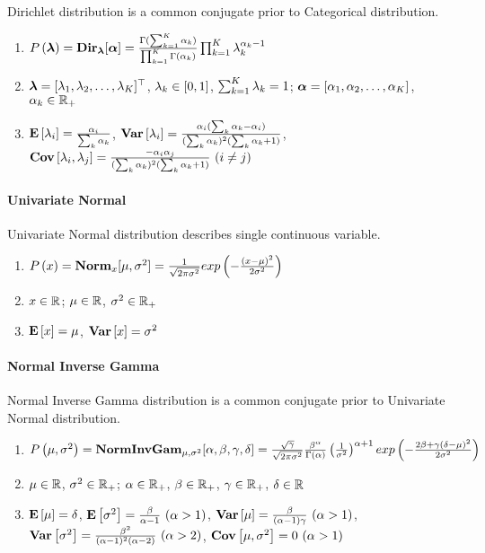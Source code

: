 Dirichlet distribution is a common conjugate prior to Categorical distribution.
\begin{enumerate}
	\item $P\left(\boldsymbol{\lambda}\right)=\mathbf{Dir}_{\boldsymbol{\lambda}}[\boldsymbol{\alpha}]=\frac{\Gamma(\sum_{k=1}^K\alpha_k)}{\prod_{k=1}^K\Gamma(\alpha_k)}\prod_{k=1}^K\lambda_k^{\alpha_k-1}$
	\item $\boldsymbol{\lambda}=[\lambda_1,\lambda_2,\dotsc,\lambda_K]{}^\top$, $\lambda_k \in [0,1]$, $\sum_{k=1}^K\lambda_k=1$; $\boldsymbol{\alpha}=[\alpha_1,\alpha_2,\dotsc,\alpha_K]$, $\alpha_k \in \mathbb{R}_+$
	\item $\mathbf{E}\left[\lambda_i\right]=\frac{\alpha_i}{\sum_k\alpha_k}$, $\mathbf{Var}\left[\lambda_i\right]=\frac{\alpha_i(\sum_k\alpha_k-\alpha_i)}{(\sum_k\alpha_k)^2(\sum_k\alpha_k+1)}$, $\C{\la_i,\la_j}=\frac{-\al_i\al_j}{(\sum_k\al_k)^2(\sum_k\al_k+1)}\ (i \neq j)$
\end{enumerate}

\paragraph{Univariate Normal}

Univariate Normal distribution describes single continuous variable.
\begin{enumerate}
	\item $P\left(x\right)=\mathbf{Norm}_x[\mu,\sigma^2]=\frac{1}{\sqrt{2\pi\sigma^2}}exp\left(-\frac{(x-\mu)^2}{2\sigma^2}\right)$
	\item $x \in \mathbb{R}$; $\mu \in \mathbb{R}$, $\sigma^2 \in \mathbb{R}_+$
	\item $\mathbf{E}\left[x\right]=\mu$, $\mathbf{Var}\left[x\right]=\sigma^2$
\end{enumerate}

\paragraph{Normal Inverse Gamma}

Normal Inverse Gamma distribution is a common conjugate prior to Univariate Normal distribution.
\begin{enumerate}
	\item $P\left(\mu,\sigma^2\right)=\mathbf{NormInvGam}_{\mu,\sigma^2}[\alpha,\beta,\gamma,\delta]=\frac{\sqrt{\gamma}}{\sqrt{2\pi\sigma^2}}\frac{\beta^\alpha}{\Gamma(\alpha)}\left(\frac{1}{\sigma^2}\right)^{\alpha+1}exp\left(-\frac{2\beta+\gamma(\delta-\mu)^2}{2\sigma^2}\right)$
	\item $\mu \in \mathbb{R}$, $\sigma^2 \in \mathbb{R}_+$; $\alpha \in \mathbb{R}_+$, $\beta \in \mathbb{R}_+$, $\gamma \in \mathbb{R}_+$, $\delta \in \mathbb{R}$
	\item $\mathbf{E}\left[\mu\right]=\delta$, $\mathbf{E}\left[\sigma^2\right]=\frac{\beta}{\alpha-1}\ (\alpha>1)$, $\V{\mu}=\frac{\be}{(\al-1)\ga}\ (\al>1)$, $\V{\si^2}=\frac{\be^2}{(\al-1)^2(\al-2)}\ (\al>2)$, $\C{\mu,\si^2}=0\ (\al>1)$
\end{enumerate}

